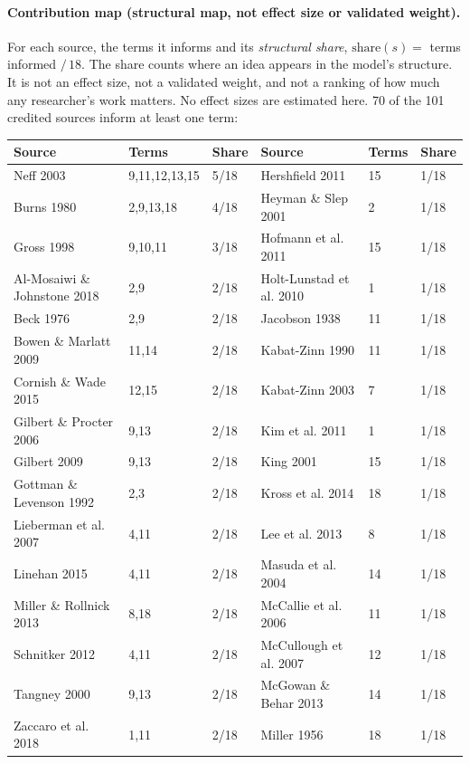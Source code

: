 \documentclass[10pt]{article}
\theoremstyle{remark}
\begin{document}
\paragraph{Contribution map (structural map, not effect size or validated weight).} For each source, the terms it informs and its \emph{structural share}, $\mathrm{share}(s)=$ terms informed $/\,18$. The share counts where an idea appears in the model's structure. It is not an effect size, not a validated weight, and not a ranking of how much any researcher's work matters. No effect sizes are estimated here. 70 of the 101 credited sources inform at least one term:
{\footnotesize
\begin{center}
\begin{tabular}{@{}lll|lll@{}}
\hline
\textbf{Source} & \textbf{Terms} & \textbf{Share} & \textbf{Source} & \textbf{Terms} & \textbf{Share}\\ \hline
Neff 2003 & 9,11,12,13,15 & 5/18 & Hershfield 2011 & 15 & 1/18\\
Burns 1980 & 2,9,13,18 & 4/18 & Heyman \& Slep 2001 & 2 & 1/18\\
Gross 1998 & 9,10,11 & 3/18 & Hofmann et al. 2011 & 15 & 1/18\\
Al-Mosaiwi \& Johnstone 2018 & 2,9 & 2/18 & Holt-Lunstad et al. 2010 & 1 & 1/18\\
Beck 1976 & 2,9 & 2/18 & Jacobson 1938 & 11 & 1/18\\
Bowen \& Marlatt 2009 & 11,14 & 2/18 & Kabat-Zinn 1990 & 11 & 1/18\\
Cornish \& Wade 2015 & 12,15 & 2/18 & Kabat-Zinn 2003 & 7 & 1/18\\
Gilbert \& Procter 2006 & 9,13 & 2/18 & Kim et al. 2011 & 1 & 1/18\\
Gilbert 2009 & 9,13 & 2/18 & King 2001 & 15 & 1/18\\
Gottman \& Levenson 1992 & 2,3 & 2/18 & Kross et al. 2014 & 18 & 1/18\\
Lieberman et al. 2007 & 4,11 & 2/18 & Lee et al. 2013 & 8 & 1/18\\
Linehan 2015 & 4,11 & 2/18 & Masuda et al. 2004 & 14 & 1/18\\
Miller \& Rollnick 2013 & 8,18 & 2/18 & McCallie et al. 2006 & 11 & 1/18\\
Schnitker 2012 & 4,11 & 2/18 & McCullough et al. 2007 & 12 & 1/18\\
Tangney 2000 & 9,13 & 2/18 & McGowan \& Behar 2013 & 14 & 1/18\\
Zaccaro et al. 2018 & 1,11 & 2/18 & Miller 1956 & 18 & 1/18\\

\end{tabular}
\end{center}}
\end{document}
